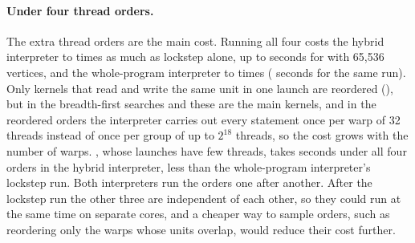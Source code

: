 \paragraph{Under four thread orders.} The extra thread orders are the main cost. Running all four costs the hybrid
interpreter \numHyOrdersLo{} to \numHyOrdersHi{} times as much as lockstep alone, up to \numHyAllS{} seconds for
 with 65{,}536 vertices, and the whole-program interpreter \numScheduleLo{} to \numScheduleHi{}
times (\numRbfsAllS{} seconds for the same run). Only kernels that read and write the same unit in one launch are
reordered (), but in the breadth-first searches and  these are the main kernels, and
in the reordered orders the interpreter carries out every statement once per warp of 32 threads instead of once
per group of up to $2^{18}$ threads, so the cost grows with the number of warps. , whose launches have
few threads, takes \numWlbfsHyAllS{} seconds under all four orders in the hybrid interpreter, less than the
whole-program interpreter's lockstep run. Both interpreters run the orders one after another. After the lockstep run
the other three are independent of each other, so they could run at the same time on separate cores, and a
cheaper way to sample orders, such as reordering only the warps whose units overlap, would reduce their cost
further.
